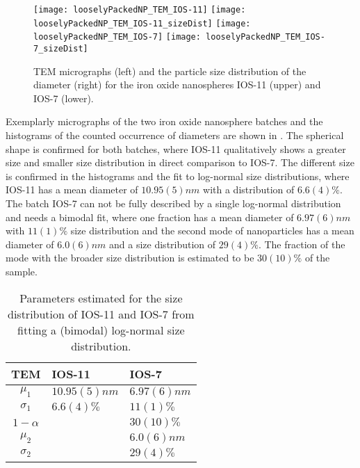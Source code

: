 \documentclass[\main/dresen_thesis.tex]{subfiles}
\begin{document}
  \label{sec:looselyPackedNS:nanoparticle:tem}
  \begin{figure}[!htbp]
    \centering
    \texttt{[image: looselyPackedNP\_TEM\_IOS-11]}
    \texttt{[image: looselyPackedNP\_TEM\_IOS-11\_sizeDist]}
    \texttt{[image: looselyPackedNP\_TEM\_IOS-7]}
    \texttt{[image: looselyPackedNP\_TEM\_IOS-7\_sizeDist]}
    \caption{\label{fig:looselyPackedNP:nanoparticle:tem}TEM micrographs (left) and the particle size distribution of the diameter (right) for the iron oxide nanospheres IOS-11 (upper) and IOS-7 (lower).}
  \end{figure}

  Exemplarly micrographs of the two iron oxide nanosphere batches and the histograms of the counted occurrence of diameters are shown in .
  The spherical shape is confirmed for both batches, where IOS-11 qualitatively shows a greater size and smaller size distribution in direct comparison to IOS-7.
  The different size is confirmed in the histograms and the fit to log-normal size distributions, where IOS-11 has a mean diameter of $10.95(5) \unit{nm}$ with a distribution of $6.6(4) \%$. 
  The batch IOS-7 can not be fully described by a single log-normal distribution and needs a bimodal fit, where one fraction has a mean diameter of $6.97(6) \unit{nm}$ with $11(1) \%$ size distribution and the second mode of nanoparticles has a mean diameter of $6.0(6) \unit{nm}$ and a size distribution of $29(4) \%$.
  The fraction of the mode with the broader size distribution is estimated to be $30(10) \%$ of the sample.

  \begin{table}[!htbp]
    \centering
    \caption{\label{tab:looselyPackedNP:nanoparticle:temModel}Parameters estimated for the size distribution of IOS-11 and IOS-7 from fitting a (bimodal) log-normal size distribution.}
    \begin{tabular}{ c | l | l }
      \textbf{TEM}  & IOS-11 & IOS-7 \\
      \hline
      $\mu_1$     & $10.95(5) \unit{nm}$  & $6.97(6) \unit{nm}$ \\
      $\sigma_1$  & $6.6(4) \unit{\%}$    & $11(1) \unit{\%}$ \\
      $1 - \alpha$&                       & $30(10)  \unit{\%}$   \\
      $\mu_2$     &                       & $6.0(6) \unit{nm}$ \\
      $\sigma_2$  &                       & $29(4) \unit{\%}$ \\
      \hline
    \end{tabular}
  \end{table}
\end{document}
